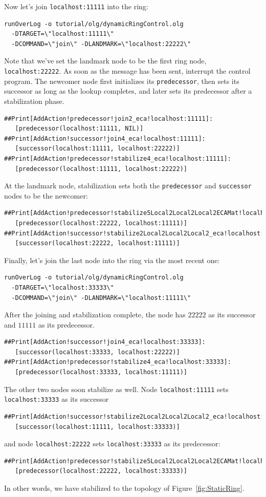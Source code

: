 \documentclass{article}
\begin{document}
Now let's join \lstinline$localhost:11111$ into the ring:
\begin{verbatim}
runOverLog -o tutorial/olg/dynamicRingControl.olg
  -DTARGET=\"localhost:11111\"
  -DCOMMAND=\"join\" -DLANDMARK=\"localhost:22222\"
\end{verbatim}
Note that we've set the landmark node to be the first ring node,
\lstinline$localhost:22222$. As soon as the message has been sent,
interrupt the control program. The newcomer node first initializes its
\lstinline$predecessor$, then sets its successor as long as the lookup
completes, and later sets its predecessor after a stabilization phase.
\begin{verbatim}
##Print[AddAction!predecessor!join2_eca!localhost:11111]:
   [predecessor(localhost:11111, NIL)]
##Print[AddAction!successor!join4_eca!localhost:11111]:
   [successor(localhost:11111, localhost:22222)]
##Print[AddAction!predecessor!stabilize4_eca!localhost:11111]:
   [predecessor(localhost:11111, localhost:22222)]
\end{verbatim}
At the landmark node, stabilization sets both the
\lstinline$predecessor$ and \lstinline$successor$ nodes to be the
newcomer:
\begin{verbatim}
##Print[AddAction!predecessor!stabilize5Local2Local2Local2ECAMat!localhost:22222]:
   [predecessor(localhost:22222, localhost:11111)]
##Print[AddAction!successor!stabilize2Local2Local2Local2_eca!localhost:22222]:
   [successor(localhost:22222, localhost:11111)]
\end{verbatim}
Finally, let's join the last node into the ring via the most recent one:
\begin{verbatim}
runOverLog -o tutorial/olg/dynamicRingControl.olg
  -DTARGET=\"localhost:33333\"
  -DCOMMAND=\"join\" -DLANDMARK=\"localhost:11111\"
\end{verbatim}
After the joining and stabilization complete, the node has $22222$ as
its successor and $11111$ as its predecessor.
\begin{verbatim}
##Print[AddAction!successor!join4_eca!localhost:33333]:
   [successor(localhost:33333, localhost:22222)]
##Print[AddAction!predecessor!stabilize4_eca!localhost:33333]:
   [predecessor(localhost:33333, localhost:11111)]
\end{verbatim}
The other two nodes soon stabilize as well. Node
\lstinline$localhost:11111$ sets \lstinline$localhost:33333$ as its
successor
\begin{verbatim}
##Print[AddAction!successor!stabilize2Local2Local2Local2_eca!localhost:11111]:
   [successor(localhost:11111, localhost:33333)]
\end{verbatim}
and node \lstinline$localhost:22222$ sets \lstinline$localhost:33333$ as
its predecessor:
\begin{verbatim}
##Print[AddAction!predecessor!stabilize5Local2Local2Local2ECAMat!localhost:22222]:
   [predecessor(localhost:22222, localhost:33333)]
\end{verbatim}
In other words, we have stabilized to the topology of
Figure~\ref{fig:StaticRing}.
\end{document}
